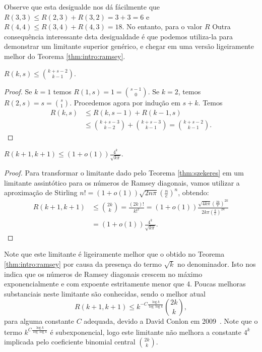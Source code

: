 Observe que esta desigualde nos dá fácilmente que $R(3,3) \leq R(2,3) + R(3,2) = 3 + 3 = 6$ e $R(4,4) \leq R(3,4) + R(4,3) = 18$. No entanto, para o valor $R$ Outra consequência interessante dsta desigualdade é que podemos utiliza-la para demonstrar um limitante superior genérico, e chegar em uma versão ligeiramente melhor do Teorema \ref{thm:intro:ramsey}.

\begin{theorem}
\label{thm:szekeres}
$\displaystyle R(k,s) \leq \binom{k + s - 2}{k - 1}$.
\end{theorem}
\begin{proof}
Se $k = 1$ temos $R(1,s) = 1 = \binom{s - 1}{0}$. Se $k = 2$, temos $R(2,s) = s = \binom{s}{1}$. Procedemos agora por indução em $s + k$. Temos
\begin{align*}
  R(k,s) &\leq R(k,s-1) + R(k-1,s) \\
  &\leq \binom{k + s - 3}{k - 2} + \binom{k + s - 3}{k - 1} = \binom{k + s - 2}{k - 1}.
\end{align*}
\end{proof}

\begin{corollary}
\label{col:szekeres}
$\displaystyle R(k+1,k+1) \leq (1+o(1))\frac{4^k}{\sqrt{k \pi}}$.
\end{corollary}
\begin{proof}
Para transformar o limitante dado pelo Teorema \ref{thm:szekeres} em um limitante assintótico para os números de Ramsey diagonais, vamos utilizar a aproximação de Stirling $n! = (1+o(1)) \sqrt{2n \pi} \left ( \frac{n}{e} \right)^n $,  obtendo:
\begin{align*}
R(k+1,k+1) &\leq \binom{2k}{k} = \frac{(2k)!}{k!^2} = (1 +o(1)) \frac{\sqrt{4 k \pi} \left ( \frac{2k}{e} \right)^{2k} }{2k\pi \left ( \frac{k}{e} \right)^{2k} } \\
&= (1 +o(1))\frac{4^k}{\sqrt{k\pi}}.
\end{align*}
\end{proof}

Note que este limitante é ligeiramente melhor que o obtido no Teorema \ref{thm:intro:ramsey} por causa da presença do termo $\sqrt{k}$ no denominador. Isto nos indica que os números de Ramsey diagonais crescem no máximo exponencialmente e com expoente estritamente menor que 4. Poucas melhoras substanciais neste limitante são conhecidas, sendo o melhor atual
\[R(k+1,k+1) \leq k^{-C\frac{\log k}{\log \log k}} \binom{2k}{k},\]
para alguma constante $C$ adequada, devido a David Conlon em 2009~\cite{conlon}. Note que o termo $k^{C\frac{\log k}{\log \log k}}$ é subexponencial, logo este limitante não melhora a constante $4^k$ implicada pelo coeficiente binomial central $\binom{2k}{k}$.

